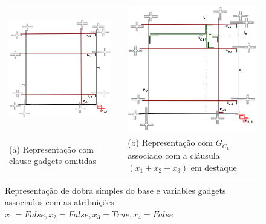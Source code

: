 \begin{figure}[h]
  \centering
  \begin{tabular}{p{10cm} p{2cm} p{10cm}}
   \centering \includegraphics[width=10cm, left]{./img/gf3.png} & & \includegraphics[width=10cm, left]{./img/formulaCompletaGFonePiePlusLines.png} \\  
  [\abovecaptionskip]
    \footnotesize \centering (a) Representação com clause gadgets omitidas & & \footnotesize(b) Representação  com  $G_{C_1}$  associado com a cláusula $(x_1+x_2+x_3)$ em destaque \\
  \end{tabular}

 \caption{Representação de dobra simples do base e variables gadgets associados com as atribuições $x_1=False, x_2=False, x_3=True, x_4=False$} \label{fig:gadgetOnePie} \label{fig:gadgetBasePlusVariables}
\end{figure}